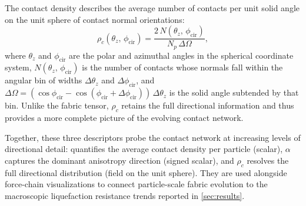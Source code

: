 The contact density \citep{Han2023} describes the average number of contacts per unit solid angle on the unit sphere of contact normal orientations:
\begin{equation}
\rho_c(\theta_z,\,\phi_{\mathrm{cir}}) = \frac{2\,N(\theta_z,\,\phi_{\mathrm{cir}})}{N_p\,\Delta\Omega},
\label{eq:contact_density}
\end{equation}
where $\theta_z$ and $\phi_{\mathrm{cir}}$ are the polar and azimuthal angles in the spherical coordinate system, $N(\theta_z,\,\phi_{\mathrm{cir}})$ is the number of contacts whose normals fall within the angular bin of widths $\Delta\theta_z$ and $\Delta\phi_{\mathrm{cir}}$, and $\Delta\Omega = (\cos\phi_{\mathrm{cir}} - \cos(\phi_{\mathrm{cir}}+\Delta\phi_{\mathrm{cir}}))\,\Delta\theta_z$ is the solid angle subtended by that bin. Unlike the fabric tensor, $\rho_c$ retains the full directional information and thus provides a more complete picture of the evolving contact network.

Together, these three descriptors probe the contact network at increasing levels of directional detail: \Zm{} quantifies the average contact density per particle (scalar), $\alpha$ captures the dominant anisotropy direction (signed scalar), and $\rho_c$ resolves the full directional distribution (field on the unit sphere). They are used alongside force-chain visualizations to connect particle-scale fabric evolution to the macroscopic liquefaction resistance trends reported in \cref{sec:results}.
